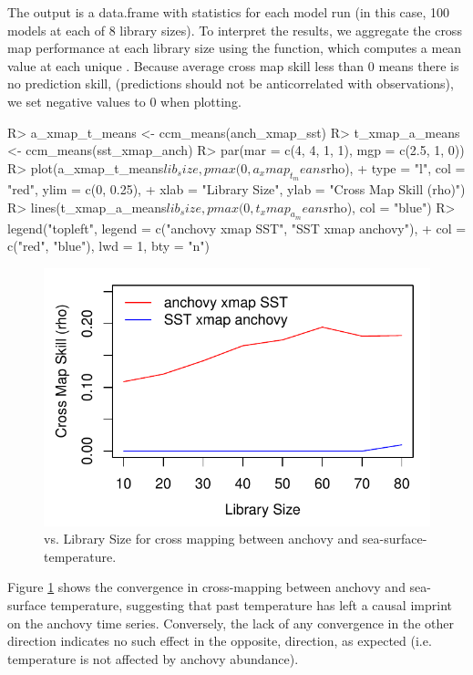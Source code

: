 \documentclass[article]{jss}
\begin{document}
The output is a data.frame with statistics for each model run (in this case, 100 models at each of 8 library sizes). To interpret the results, we aggregate the cross map performance at each library size using the  function, which computes a mean value at each unique . Because average cross map skill less than 0 means there is no prediction skill, (predictions should not be anticorrelated with observations), we set negative values to 0 when plotting.

\begin{Schunk}
\begin{Sinput}
R> a_xmap_t_means <- ccm_means(anch_xmap_sst)
R> t_xmap_a_means <- ccm_means(sst_xmap_anch)
R> par(mar = c(4, 4, 1, 1), mgp = c(2.5, 1, 0))
R> plot(a_xmap_t_means$lib_size, pmax(0, a_xmap_t_means$rho), 
+       type = "l", col = "red", ylim = c(0, 0.25), 
+       xlab = "Library Size", ylab = "Cross Map Skill (rho)")
R> lines(t_xmap_a_means$lib_size, pmax(0, t_xmap_a_means$rho), col = "blue")
R> legend("topleft", legend = c("anchovy xmap SST", "SST xmap anchovy"),
+         col = c("red", "blue"), lwd = 1, bty = "n")
\end{Sinput}
\end{Schunk}

\begin{figure}[t!]
\begin{center}
\includegraphics[width=4.5in]{article-ccm-anchovy-sst}
\end{center}
\caption{\label{fig:ccm-anchovy-sst}  vs. Library Size for cross mapping between anchovy and sea-surface-temperature.}
\end{figure}

Figure \ref{fig:ccm-anchovy-sst} shows the convergence in cross-mapping between anchovy and sea-surface temperature, suggesting that past temperature has left a causal imprint on the anchovy time series. Conversely, the lack of any convergence in the other direction indicates no such effect in the opposite, direction, as expected (i.e. temperature is not affected by anchovy abundance).
\end{document}
